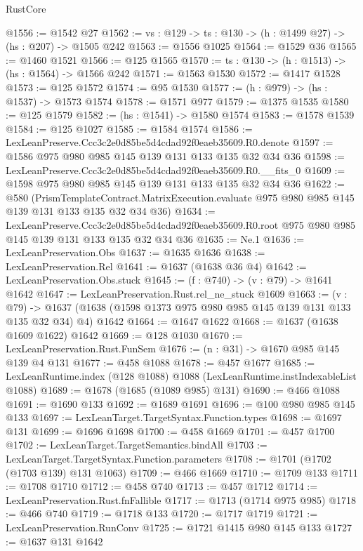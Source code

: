 \begin{lexlean}{RustCore}
\begin{coremodule}
@1556 := @1542 @27
@1562 := {vs : @129} -> {ts : @130} -> (h : @1499 @27) -> (hs : @207) -> @1505 @242
@1563 := @1556 @1025
@1564 := @1529 @36
@1565 := @1460 @1521
@1566 := @125 @1565
@1570 := {ts : @130} -> (h : @1513) -> (hs : @1564) -> @1566 @242
@1571 := @1563 @1530
@1572 := @1417 @1528
@1573 := @125 @1572
@1574 := @95 @1530
@1577 := (h : @979) -> (hs : @1537) -> @1573 @1574
@1578 := @1571 @977
@1579 := @1375 @1535
@1580 := @125 @1579
@1582 := (hs : @1541) -> @1580 @1574
@1583 := @1578 @1539
@1584 := @125 @1027
@1585 := @1584 @1574
@1586 := LexLeanPreserve.Ccc3c2e0d85be5d4cdad92f0eaeb35609.R0.denote
@1597 := @1586 @975 @980 @985 @145 @139 @131 @133 @135 @32 @34 @36
@1598 := LexLeanPreserve.Ccc3c2e0d85be5d4cdad92f0eaeb35609.R0.__fits_0
@1609 := @1598 @975 @980 @985 @145 @139 @131 @133 @135 @32 @34 @36
@1622 := @580
    (PrismTemplateContract.MatrixExecution.evaluate
      @975
      @980
      @985
      @145
      @139
      @131
      @133
      @135
      @32
      @34
      @36)
@1634 := LexLeanPreserve.Ccc3c2e0d85be5d4cdad92f0eaeb35609.R0.root
    @975
    @980
    @985
    @145
    @139
    @131
    @133
    @135
    @32
    @34
    @36
@1635 := Ne.{1}
@1636 := LexLeanPreservation.Obs
@1637 := @1635 @1636
@1638 := LexLeanPreservation.Rel
@1641 := @1637 (@1638 @36 @4)
@1642 := LexLeanPreservation.Obs.stuck
@1645 := (f : @740) -> (v : @79) -> @1641 @1642
@1647 := LexLeanPreservation.Rust.rel_ne_stuck @1609
@1663 := (v : @79) ->
  @1637 (@1638 (@1598 @1373 @975 @980 @985 @145 @139 @131 @133 @135 @32 @34) @4) @1642
@1664 := @1647 @1622
@1668 := @1637 (@1638 @1609 @1622) @1642
@1669 := @128 @1030
@1670 := LexLeanPreservation.Rust.FunSem
@1676 := (n : @31) -> @1670 @985 @145 @139 @4 @131
@1677 := @458 @1088
@1678 := @457 @1677
@1685 := LexLeanRuntime.index (@128 @1088) @1088 (LexLeanRuntime.instIndexableList @1088)
@1689 := @1678 (@1685 (@1089 @985) @131)
@1690 := @466 @1088
@1691 := @1690 @133
@1692 := @1689 @1691
@1696 := @100 @980 @985 @145 @133
@1697 := LexLeanTarget.TargetSyntax.Function.types
@1698 := @1697 @131
@1699 := @1696 @1698
@1700 := @458 @1669
@1701 := @457 @1700
@1702 := LexLeanTarget.TargetSemantics.bindAll
@1703 := LexLeanTarget.TargetSyntax.Function.parameters
@1708 := @1701 (@1702 (@1703 @139) @131 @1063)
@1709 := @466 @1669
@1710 := @1709 @133
@1711 := @1708 @1710
@1712 := @458 @740
@1713 := @457 @1712
@1714 := LexLeanPreservation.Rust.fnFallible
@1717 := @1713 (@1714 @975 @985)
@1718 := @466 @740
@1719 := @1718 @133
@1720 := @1717 @1719
@1721 := LexLeanPreservation.RunConv
@1725 := @1721 @1415 @980 @145 @133
@1727 := @1637 @131 @1642

\end{coremodule}
\end{lexlean}
